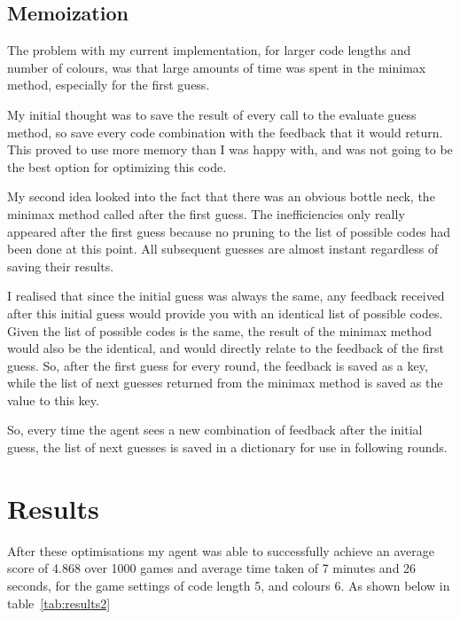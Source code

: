 \documentclass[12pt]{article}
\begin{document}


\subsection{Memoization}
The problem with my current implementation, for larger code lengths and number of colours, was that large amounts of time was spent in the minimax method, especially for the first guess. 

My initial thought was to save the result of every call to the evaluate guess method, so save every code combination with the feedback that it would return. This proved to use more memory than I was happy with, and was not going to be the best option for optimizing this code.

My second idea looked into the fact that there was an obvious bottle neck, the minimax method called after the first guess. The inefficiencies only really appeared after the first guess because no pruning to the list of possible codes had been done at this point. All subsequent guesses are almost instant regardless of saving their results.

I realised that since the initial guess was always the same, any feedback received after this initial guess would provide you with an identical list of possible codes. Given the list of possible codes is the same, the result of the minimax method would also be the identical, and would directly relate to the feedback of the first guess. So, after the first guess for every round, the feedback is saved as a key, while the list of next guesses returned from the minimax method is saved as the value to this key. 

So, every time the agent sees a new combination of feedback after the initial guess, the list of next guesses is saved in a dictionary for use in following rounds. 

\section{Results}
After these optimisations my agent was able to successfully achieve an average score of 4.868 over 1000 games and average time taken of 7 minutes and 26 seconds, for the game settings of code length 5, and colours 6. As shown below in table~\ref{tab:results2}
\end{document}
